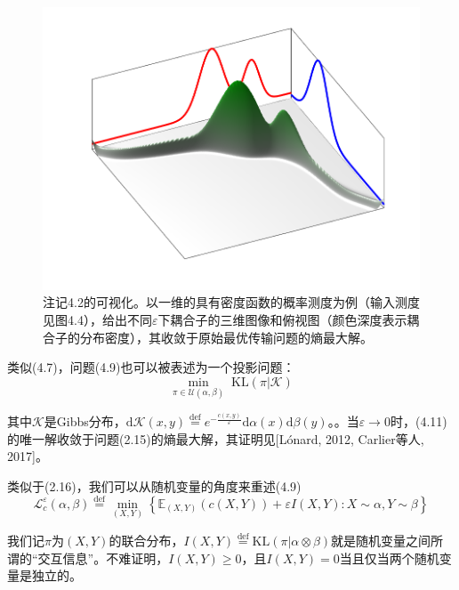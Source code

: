 \documentclass[cn,10pt,math=newtx,citestyle=gb7714-2015,bibstyle=gb7714-2015]{elegantbook}
\begin{document}
\begin{figure}[H]
\begin{minipage}{0.20\linewidth}
		\caption*{$\varepsilon = 10^{-2}$}
	\end{minipage}
	\begin{minipage}{0.20\linewidth}
		\centering
		\includegraphics[width=0.95\linewidth]{figure/fig4.2/evol-3d-50.png}
		\caption*{$\varepsilon = 10^{-3}$}
	\end{minipage}
	
	\vspace{1em}
	\caption{注记4.2的可视化。以一维的具有密度函数的概率测度为例（输入测度见图4.4），给出不同$\varepsilon$下耦合子的三维图像和俯视图（颜色深度表示耦合子的分布密度），其收敛于原始最优传输问题的熵最大解。}
	\label{图4.3}
\end{figure}

类似(4.7)，问题(4.9)也可以被表述为一个投影问题：
\begin{equation}
    \label{4.11}
    \min\limits_{\pi\in\mathcal{U}(\alpha,\beta)} \; \text{KL}(\pi|\mathcal{K})
\end{equation}

其中$\mathcal{K}$是Gibbs分布，$\text{d}\mathcal{K}(x,y)\overset{\text{def}}{=} e^{-\frac{c(x,y)}{\varepsilon}}\text{d}\alpha(x)\text{d}\beta(y)$。。当$\varepsilon\to 0$时，(4.11)的唯一解收敛于问题(2.15)的熵最大解，其证明见[L\'onard, 2012, Carlier等人, 2017]。

\begin{postulate}[交互熵]
类似于(2.16)，我们可以从随机变量的角度来重述(4.9)
\begin{equation*}
    \mathcal{L}_c^\varepsilon(\alpha,\beta)\overset{\text{def}}{=}\min\limits_{(X,Y)} \left\{ \mathbb{E}_{(X,Y)}(c(X,Y))+\varepsilon I(X,Y):X\sim \alpha, Y\sim \beta \right\}
\end{equation*}

我们记$\pi$为$(X,Y)$的联合分布，$I(X,Y)\overset{\text{def}}{=} \text{KL}(\pi|\alpha \otimes \beta)$就是随机变量之间所谓的“交互信息”。不难证明，$I(X,Y)\geq 0$，且$I(X,Y)=0$当且仅当两个随机变量是独立的。
\end{postulate}
\end{document}
